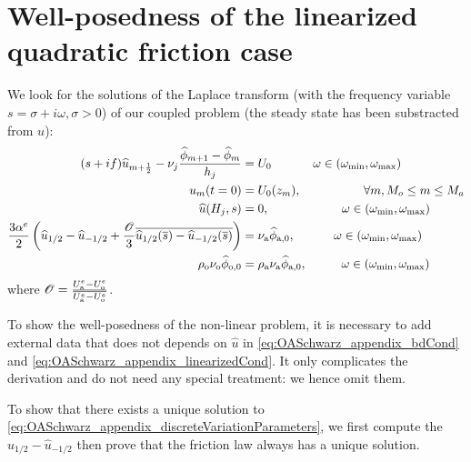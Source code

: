 \section{Well-posedness of the linearized quadratic friction case}
\label{sec:OASchwarz_appendix_discreteVariationParameters}
We look for the solutions of the Laplace transform
(with the frequency variable $s=\sigma + i\omega, \sigma>0$) of our
coupled problem (the steady state has been substracted from $u$):
\begin{subequations}
	\label{eq:OASchwarz_appendix_discreteVariationParameters}
	\begin{align}
	(s + if) \widehat{u}_{m+\frac{1}{2}} -
		\nu_j \frac{\widehat{\phi}_{m+1} -
		\widehat{\phi}_m}{h_j}
		&=U_0
	\hspace{1.2cm} \omega \in
	(\omega_{\min},\omega_{\max})
		\label{eq:OASchwarz_appendix_eqFourier}\\
		u_m(t=0) &= U_0(z_m),   \hspace{1.8cm}
		\forall m, M_o \leq m \leq M_a \\
		\widehat{u}(H_j, s) &= 0,
		\hspace{2.1cm}
		\omega \in (\omega_{\min},\omega_{\max})
		\label{eq:OASchwarz_appendix_bdCond}\\
		\frac{3\alpha^e}{2} 
		\left( \widehat{u}_{1/2} - \widehat{u}_{-1/2}
		+ \frac{{\cal O}}{3} \overline{
			\widehat{u}_{1/2}(\overline{s}) -
		\widehat{u}_{-1/2}(\overline{s})} \right) &=
		\nu_{\rm a}\widehat{\phi}_{\rm a, 0},
		\hspace{1.12cm}
		\omega \in (\omega_{\min},\omega_{\max})
		\label{eq:OASchwarz_appendix_linearizedCond}
		\\
		\rho_{\rm o} \nu_{\rm o}\widehat{\phi}_{\rm o, 0}
		&= \rho_{\rm a} \nu_{\rm a}\widehat{\phi}_{\rm a, 0},
		\hspace{1.0cm}
		\omega \in (\omega_{\min},\omega_{\max})
		\label{eq:OASchwarz_appendix_continuityFlux}
		\end{align}
		\end{subequations}
where ${\cal O} = \frac{U_{\rm a}^e - U_{\rm o}^e}{\overline{U_{\rm a}^e
	- U_{\rm o}^e}}$.
\begin{remark}
	To show the well-posedness of the non-linear
	problem, it is necessary to add external data
	that does not depends on $\widehat{u}$
	in \eqref{eq:OASchwarz_appendix_bdCond} and
	\eqref{eq:OASchwarz_appendix_linearizedCond}.
	It only complicates the derivation and do not need
	any special treatment: we hence omit them.
\end{remark}
To show that there exists a unique solution to
\eqref{eq:OASchwarz_appendix_discreteVariationParameters},
we first compute the $\widehat{u}_{1/2} - \widehat{u}_{-1/2}$
then prove that the friction law always has a unique solution.
